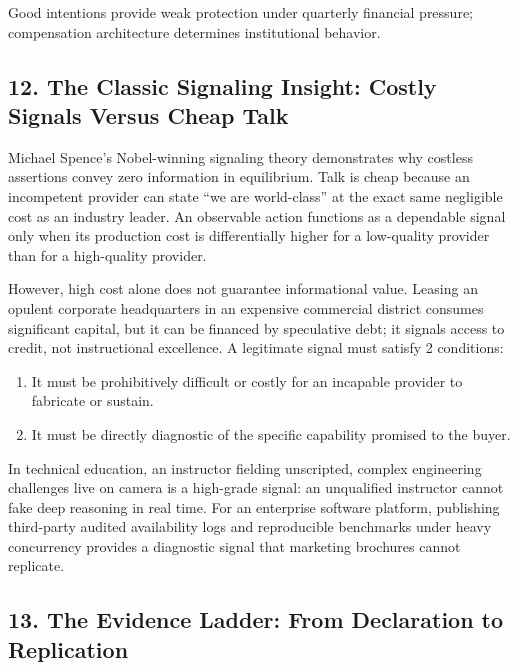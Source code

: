 Good intentions provide weak protection under quarterly financial pressure; compensation architecture determines institutional behavior.

\subsection*{12. The Classic Signaling Insight: Costly Signals Versus Cheap Talk}

Michael Spence's Nobel-winning signaling theory demonstrates why costless assertions convey zero information in equilibrium. Talk is cheap because an incompetent provider can state ``we are world-class'' at the exact same negligible cost as an industry leader. An observable action functions as a dependable signal only when its production cost is differentially higher for a low-quality provider than for a high-quality provider.

However, high cost alone does not guarantee informational value. Leasing an opulent corporate headquarters in an expensive commercial district consumes significant capital, but it can be financed by speculative debt; it signals access to credit, not instructional excellence. A legitimate signal must satisfy 2 conditions:
\begin{enumerate}
\item It must be prohibitively difficult or costly for an incapable provider to fabricate or sustain.
\item It must be directly diagnostic of the specific capability promised to the buyer.
\end{enumerate}

In technical education, an instructor fielding unscripted, complex engineering challenges live on camera is a high-grade signal: an unqualified instructor cannot fake deep reasoning in real time. For an enterprise software platform, publishing third-party audited availability logs and reproducible benchmarks under heavy concurrency provides a diagnostic signal that marketing brochures cannot replicate.

\subsection*{13. The Evidence Ladder: From Declaration to Replication}

